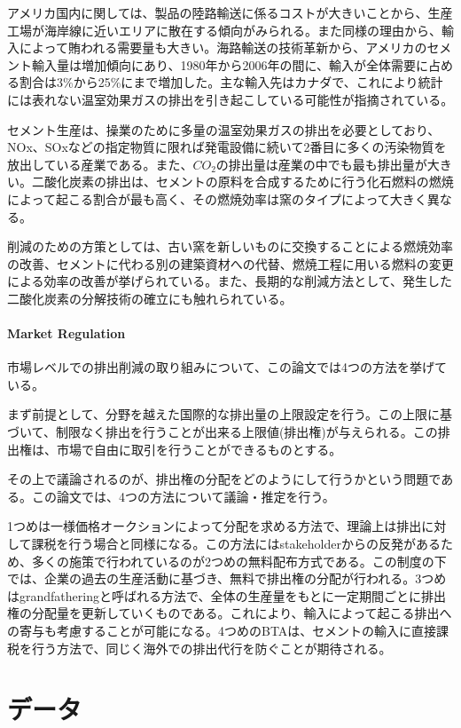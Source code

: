 \documentclass[11pt]{jsarticle}
\begin{document}
アメリカ国内に関しては、製品の陸路輸送に係るコストが大きいことから、生産工場が海岸線に近いエリアに散在する傾向がみられる。また同様の理由から、輸入によって賄われる需要量も大きい。海路輸送の技術革新から、アメリカのセメント輸入量は増加傾向にあり、1980年から2006年の間に、輸入が全体需要に占める割合は3\%から25\%にまで増加した。主な輸入先はカナダで、これにより統計には表れない温室効果ガスの排出を引き起こしている可能性が指摘されている。

セメント生産は、操業のために多量の温室効果ガスの排出を必要としており、NOx、SOxなどの指定物質に限れば発電設備に続いて2番目に多くの汚染物質を放出している産業である。また、$CO_2$の排出量は産業の中でも最も排出量が大きい。二酸化炭素の排出は、セメントの原料を合成するために行う化石燃料の燃焼によって起こる割合が最も高く、その燃焼効率は窯のタイプによって大きく異なる。

削減のための方策としては、古い窯を新しいものに交換することによる燃焼効率の改善、セメントに代わる別の建築資材への代替、燃焼工程に用いる燃料の変更による効率の改善が挙げられている。また、長期的な削減方法として、発生した二酸化炭素の分解技術の確立にも触れられている。

\paragraph{Market Regulation}

市場レベルでの排出削減の取り組みについて、この論文では4つの方法を挙げている。

まず前提として、分野を越えた国際的な排出量の上限設定を行う。この上限に基づいて、制限なく排出を行うことが出来る上限値(排出権)が与えられる。この排出権は、市場で自由に取引を行うことができるものとする。

その上で議論されるのが、排出権の分配をどのようにして行うかという問題である。この論文では、4つの方法について議論・推定を行う。

1つめは一様価格オークションによって分配を求める方法で、理論上は排出に対して課税を行う場合と同様になる。この方法にはstakeholderからの反発があるため、多くの施策で行われているのが2つめの無料配布方式である。この制度の下では、企業の過去の生産活動に基づき、無料で排出権の分配が行われる。3つめはgrandfatheringと呼ばれる方法で、全体の生産量をもとに一定期間ごとに排出権の分配量を更新していくものである。これにより、輸入によって起こる排出への寄与も考慮することが可能になる。4つめのBTAは、セメントの輸入に直接課税を行う方法で、同じく海外での排出代行を防ぐことが期待される。

\section{データ}
\end{document}
